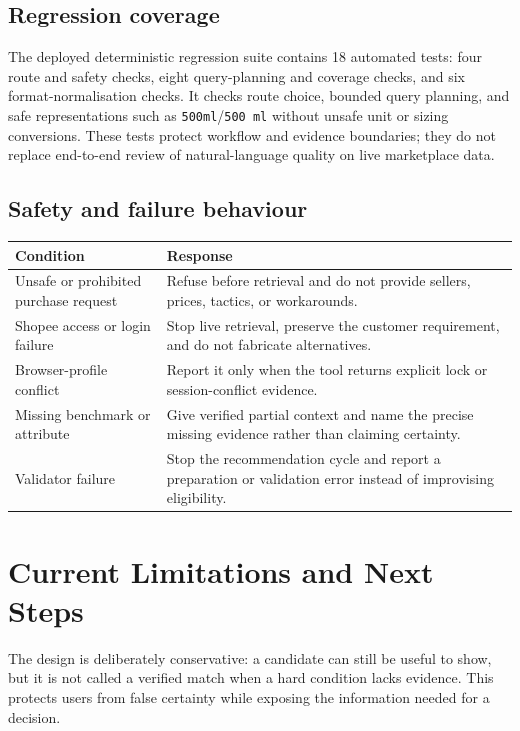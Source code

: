\documentclass[11pt,letterpaper]{article}
\newcommand{\thead}[1]{\bfseries\centering #1\arraybackslash}
\begin{document}
\subsection{Regression coverage}

The deployed deterministic regression suite contains 18 automated tests: four route and safety checks, eight query-planning and coverage checks, and six format-normalisation checks. It checks route choice, bounded query planning, and safe representations such as \texttt{500ml}/\texttt{500 ml} without unsafe unit or sizing conversions. These tests protect workflow and evidence boundaries; they do not replace end-to-end review of natural-language quality on live marketplace data.

\subsection{Safety and failure behaviour}
\begin{tabularx}{\textwidth}{@{}p{2.12in}Y@{}}
\thead{Condition} & \thead{Response} \\
\toprule
Unsafe or prohibited purchase request & Refuse before retrieval and do not provide sellers, prices, tactics, or workarounds. \\
Shopee access or login failure & Stop live retrieval, preserve the customer requirement, and do not fabricate alternatives. \\
Browser-profile conflict & Report it only when the tool returns explicit lock or session-conflict evidence. \\
Missing benchmark or attribute & Give verified partial context and name the precise missing evidence rather than claiming certainty. \\
Validator failure & Stop the recommendation cycle and report a preparation or validation error instead of improvising eligibility. \\
\bottomrule
\end{tabularx}

\section{Current Limitations and Next Steps}

The design is deliberately conservative: a candidate can still be useful to show, but it is not called a verified match when a hard condition lacks evidence. This protects users from false certainty while exposing the information needed for a decision.
\end{document}
